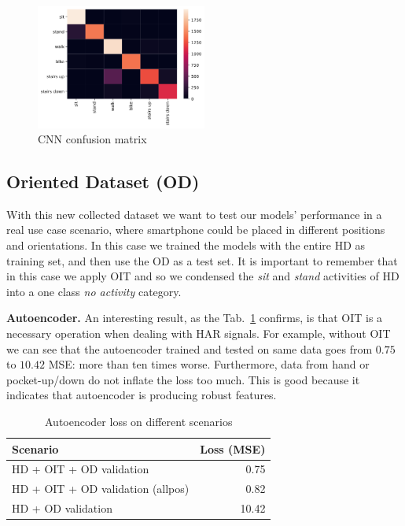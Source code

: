 \vspace{-0.2cm}
\begin{figure}[h]
	\centering
	\includegraphics[width=0.5\textwidth]{images/confusion_matrix.png}
	\caption{CNN confusion matrix}
	\label{fig:cnn-confusion-matrix}
\end{figure}

\vspace{-0.3cm}

\subsection{Oriented Dataset (OD)}

With this new collected dataset we want to test our models' performance
in a real use case scenario, where smartphone could be placed in
different positions and orientations. In this case we trained the
models with the entire HD as training set, and then use the OD as a
test set. It is important to remember that in this case we apply OIT
and so we condensed the \textit{sit} and \textit{stand} activities of
HD into a one class \textit{no activity} category.

\textbf{Autoencoder.}  An interesting result, as the
Tab.~\ref{tab:ae-loss} confirms, is that OIT is a necessary operation
when dealing with HAR signals. For example, without OIT we can see
that the autoencoder trained and tested on same data goes from $0.75$
to $10.42$ MSE: more than ten times worse. Furthermore, data from
hand or pocket-up/down do not inflate the loss too much. This is good
because it indicates that autoencoder is producing robust features.

\begin{table}[t]
  \centering
  \begin{tabular}{lr}
    \hline
    Scenario & Loss (MSE) \\
    \hline
    HD + OIT + OD validation & 0.75 \\
    HD + OIT + OD validation (allpos) & 0.82 \\
    HD + OD validation & 10.42 \\
    \hline
  \end{tabular}
  \caption{Autoencoder loss on different scenarios}
  \label{tab:ae-loss}
\end{table}

